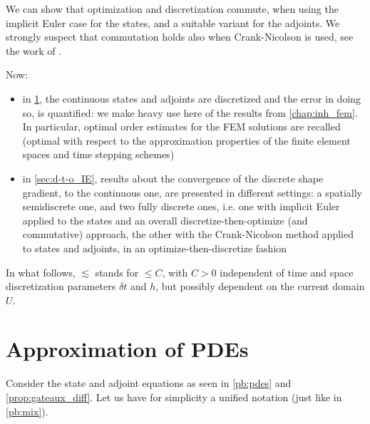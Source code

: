 \documentclass[english,a4paper,9pt,oneside]{scrbook}	%
\theoremstyle{break}
\theoremstyle{remark}
\begin{document}
We can show that optimization and discretization commute, when using the implicit Euler case for the states, and a suitable variant for the adjoints. We strongly suspect that commutation holds also when Crank-Nicolson is used, see the work of \cite{flaig}.

Now:

\begin{itemize}
	\item in \cref{sec:o-t-d}, the continuous states and adjoints are discretized and the error in doing so, is quantified: we make heavy use here of the results from \cref{chap:inh_fem}. In particular, optimal order estimates for the FEM solutions are recalled (optimal with respect to the approximation properties of the finite element spaces and time stepping schemes)
	\item in \cref{sec:d-t-o_IE}, results about the convergence of the discrete shape gradient, to the continuous one, are presented in different settings: a spatially semidiscrete one, and two fully discrete ones, i.e. one with implicit Euler applied to the states and an overall discretize-then-optimize (and commutative) approach, the other with the Crank-Nicolson method applied to states and adjoints, in an optimize-then-discretize fashion
\end{itemize}

In what follows, $\lesssim$ stands for $\leq C$, with $C>0$ independent of time and space discretization parameters $\delta t$ and $h$, but possibly dependent on the current domain $U$.

\section{Approximation of PDEs}
\label{sec:o-t-d}

Consider the state and adjoint equations as seen in \cref{pb:pdes} and \cref{prop:gateaux_diff}. Let us have for simplicity a unified notation (just like in \cref{pb:mix}).
\end{document}
